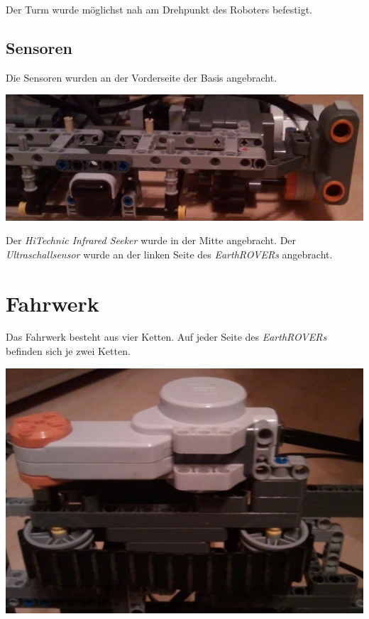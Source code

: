 Der Turm wurde möglichst nah am Drehpunkt des Roboters befestigt. 

\subsection{Sensoren}
\label{cha:sensoren}
Die Sensoren wurden an der Vorderseite der Basis angebracht. 

\begin{capfigure}[Sensoren]
	\includegraphics[width=\textwidth]{images/construction/basis/sensoren}
\end{capfigure}

Der \textit{HiTechnic Infrared Seeker} wurde in der Mitte angebracht. Der \textit{Ultraschallsensor} wurde an der linken Seite des \textit{EarthROVERs} angebracht.

\section{Fahrwerk}
\label{cha:fahrwerk}
Das Fahrwerk besteht aus vier Ketten. Auf jeder Seite des \textit{EarthROVERs} befinden sich je zwei Ketten.

\begin{capfigure}[Fahrwerk]
	\includegraphics[width=\textwidth]{images/construction/basis/kette}
\end{capfigure}

